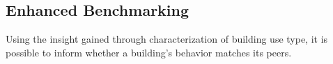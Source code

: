 \subsection{Enhanced Benchmarking}
\label{sec:results_benchmarking}

Using the insight gained through characterization of building use type, it is possible to inform whether a building's behavior matches its peers.